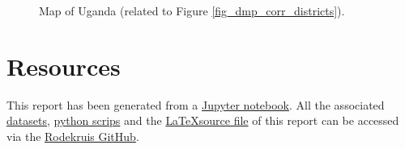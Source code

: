 \documentclass[10pt,parskip=half,
toc=sectionentrywithdots,
bibliography=totocnumbered,
captions=tableheading,numbers=noendperiod]{scrartcl}
\begin{document}
\begin{figure}[H]
\hypertarget{fig_ugandamap}{%
\begin{center}
\end{center}
\caption{Map of Uganda (related to Figure \ref{fig_dmp_corr_districts}).}\label{fig_ugandamap}
}
\end{figure}

\hypertarget{resources}{%
\section{Resources}\label{resources}}

This report has been generated from a
\href{https://github.com/rodekruis/IBF-system/blob/master/trigger-model-development/drought/skill-assessment/Model\%20Event\%20Data/Uganda_logit_model.ipynb}{Jupyter
notebook}. All the associated
\href{https://github.com/rodekruis/IBF-system/tree/master/trigger-model-development/drought/skill-assessment/Model\%20Event\%20Data/datasets}{datasets},
\href{https://github.com/rodekruis/IBF-system/blob/master/trigger-model-development/drought/skill-assessment/Model\%20Event\%20Data/drought_ibf_utility.py}{python
scrips} and the
\href{https://github.com/rodekruis/IBF-system/blob/master/trigger-model-development/drought/skill-assessment/Model\%20Event\%20Data/converted/Uganda_logit_model.tex}{\LaTeX source
file} of this report can be accessed via the
\href{https://github.com/rodekruis/IBF-system/tree/master/trigger-model-development/drought/skill-assessment/Model\%20Event\%20Data}{Rodekruis
GitHub}.
\end{document}
